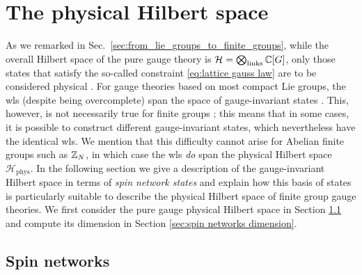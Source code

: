 \section{The physical Hilbert space}\label{sec:physical Hilbert space}

As we remarked in Sec.~\ref{sec:from_lie_groups_to_finite_groups}, while the overall Hilbert space of the pure gauge theory is $\mathcal{H} = \bigotimes_{\mathrm{links}} \mathbb{C}[G]$, only those states that satisfy the so-called  constraint \eqref{eq:lattice gauss law} are to be considered physical \cite{kogut1975hamiltonian, milstead2018qyangmills, tong2018gauge}.
For gauge theories based on most compact Lie groups, the \ac{wl}s (despite being overcomplete) span the space of gauge-invariant states \cite{Sengupta, Durhuus}.
This, however, is not necessarily true for finite groups \cite{Sengupta, Cui}; this means that in some cases, it is possible to construct different gauge-invariant states, which nevertheless have the identical \ac{wl}s.
We mention that this difficulty cannot arise for Abelian finite groups such as $\mathbb{Z}_N$, in which case the \ac{wl}s \textit{do} span the physical Hilbert space $\mathcal{H}_{\mathrm{phys}}$.
In the following section we give a description of the gauge-invariant Hilbert space in terms of \textit{spin network states} and explain how this basis of states is particularly suitable to describe the physical Hilbert space of finite group gauge theories.
We first consider the pure gauge physical Hilbert space in Section \ref{sec:spin networks pure gauge} and compute its dimension in Section \ref{sec:spin networks dimension}.

\subsection{Spin networks}\label{sec:spin networks pure gauge}

